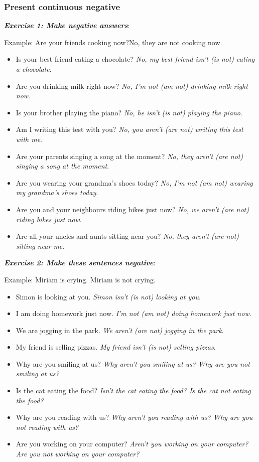 \subsubsection{Present continuous negative}

\textbf{\textit{Exercise 1: Make negative answers}}:

Example: 
Are your friends cooking now?No, they are not cooking now.

\begin{itemize}

\item Is your best friend eating a chocolate? \textit{No, my best friend isn't (is not) eating a chocolate}.
\item Are you drinking milk right now? \textit{No, I'm not (am not) drinking milk right now}.
\item Is your brother playing the piano? \textit{No, he isn't (is not) playing the piano}.
\item Am I writing this test with you? \textit{No, you aren't (are not) writing this test with me}.
\item Are your parents singing a song at the moment? \textit{No, they aren't (are not) singing a song at the moment}.
\item Are you wearing your grandma's shoes today? \textit{No, I'm not (am not) wearing my grandma's shoes today}.
\item Are you and your neighbours riding bikes just now? \textit{No, we aren't (are not) riding bikes just now}.
\item Are all your uncles and aunts sitting near you? \textit{No, they aren't (are not) sitting near me}.

\end{itemize}

\textbf{\textit{Exercise 2: Make these sentences negative}}:

Example:
Miriam is crying.
Miriam is not crying.

\begin{itemize}

\item Simon is looking at you. \textit{Simon isn't (is not) looking at you}.
\item I am doing homework just now. \textit{I'm not (am not) doing homework just now}.
\item We are jogging in the park. \textit{We aren't (are not) jogging in the park}.
\item My friend is selling pizzas. \textit{My friend isn't (is not) selling pizzas}.
\item Why are you smiling at us? \textit{Why aren't you smiling at us? Why are you not smiling at us?}
\item Is the cat eating the food? \textit{Isn't the cat eating the food? Is the cat not eating the food?}
\item Why are you reading with us? \textit{Why aren't you reading with us? Why are you not reading with us?}
\item Are you working on your computer? \textit{Aren't you working on your computer? Are you not working on your computer?}

\end{itemize}

